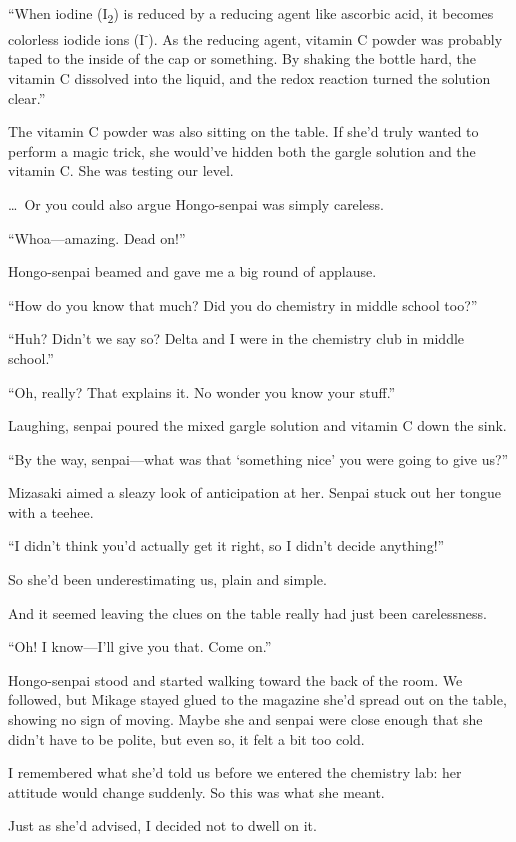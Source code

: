 \documentclass[
    a4paper,
    12pt,
    twoside,
    openany,
    UTF8,
    fontset=windows
]{ctexbook}
\begin{document}
``When iodine (I\textsubscript{2}) is reduced by a reducing agent like ascorbic acid, it becomes colorless iodide ions (I\textsuperscript{-}). As the reducing agent, vitamin C powder was probably taped to the inside of the cap or something. By shaking the bottle hard, the vitamin C dissolved into the liquid, and the redox reaction turned the solution clear.''

The vitamin C powder was also sitting on the table. If she'd truly wanted to perform a magic trick, she would've hidden both the gargle solution and the vitamin C. She was testing our level.

\dots\ Or you could also argue Hongo-senpai was simply careless.

``Whoa---amazing. Dead on!''

Hongo-senpai beamed and gave me a big round of applause.

``How do you know that much? Did you do chemistry in middle school too?''

``Huh? Didn't we say so? Delta and I were in the chemistry club in middle school.''

``Oh, really? That explains it. No wonder you know your stuff.''

Laughing, senpai poured the mixed gargle solution and vitamin C down the sink.

``By the way, senpai---what was that `something nice' you were going to give us?''

Mizasaki aimed a sleazy look of anticipation at her. Senpai stuck out her tongue with a teehee.

``I didn't think you'd actually get it right, so I didn't decide anything!''

So she'd been underestimating us, plain and simple.

And it seemed leaving the clues on the table really had just been carelessness.

``Oh! I know---I'll give you that. Come on.''

Hongo-senpai stood and started walking toward the back of the room. We followed, but Mikage stayed glued to the magazine she'd spread out on the table, showing no sign of moving. Maybe she and senpai were close enough that she didn't have to be polite, but even so, it felt a bit too cold.

I remembered what she'd told us before we entered the chemistry lab: her attitude would change suddenly. So this was what she meant.

Just as she'd advised, I decided not to dwell on it.
\end{document}
